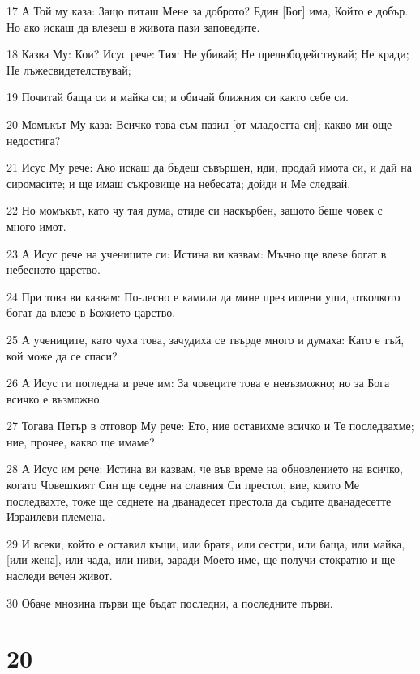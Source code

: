 \par 17 А Той му каза: Защо питаш Мене за доброто? Един [Бог] има, Който е добър. Но ако искаш да влезеш в живота пази заповедите.
\par 18 Казва Му: Кои? Исус рече: Тия: Не убивай; Не прелюбодействувай; Не кради; Не лъжесвидетелствувай;
\par 19 Почитай баща си и майка си; и обичай ближния си както себе си.
\par 20 Момъкът Му каза: Всичко това съм пазил [от младостта си]; какво ми още недостига?
\par 21 Исус Му рече: Ако искаш да бъдеш съвършен, иди, продай имота си, и дай на сиромасите; и ще имаш съкровище на небесата; дойди и Ме следвай.
\par 22 Но момъкът, като чу тая дума, отиде си наскърбен, защото беше човек с много имот.
\par 23 А Исус рече на учениците си: Истина ви казвам: Мъчно ще влезе богат в небесното царство.
\par 24 При това ви казвам: По-лесно е камила да мине през иглени уши, отколкото богат да влезе в Божието царство.
\par 25 А учениците, като чуха това, зачудиха се твърде много и думаха: Като е тъй, кой може да се спаси?
\par 26 А Исус ги погледна и рече им: За човеците това е невъзможно; но за Бога всичко е възможно.
\par 27 Тогава Петър в отговор Му рече: Ето, ние оставихме всичко и Те последвахме; ние, прочее, какво ще имаме?
\par 28 А Исус им рече: Истина ви казвам, че във време на обновлението на всичко, когато Човешкият Син ще седне на славния Си престол, вие, които Ме последвахте, тоже ще седнете на дванадесет престола да съдите дванадесетте Израилеви племена.
\par 29 И всеки, който е оставил къщи, или братя, или сестри, или баща, или майка, [или жена], или чада, или ниви, заради Моето име, ще получи стократно и ще наследи вечен живот.
\par 30 Обаче мнозина първи ще бъдат последни, а последните първи.

\chapter{20}

